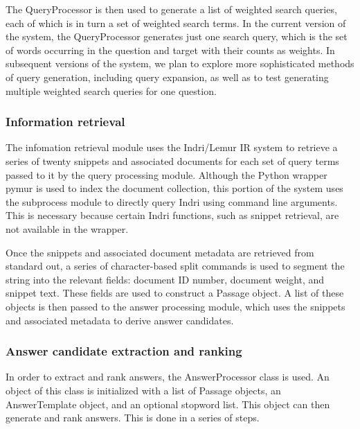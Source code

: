 \documentclass[11pt]{article}
\begin{document}
The QueryProcessor is then used to generate a list of weighted search queries, each of which is in turn a set of weighted search terms. In the current version of the system, the QueryProcessor generates just one search query, which is the set of words occurring in the question and target with their counts as weights. In subsequent versions of the system, we plan to explore more sophisticated methods of query generation, including query expansion, as well as to test generating multiple weighted search queries for one question.

\subsubsection{Information retrieval}

The infomation retrieval module uses the Indri/Lemur IR system to retrieve a series of twenty snippets and associated documents for each set of query terms passed to it by the query processing module. Although the Python wrapper pymur is used to index the document collection, this portion of the system uses the subprocess module to directly query Indri using command line arguments. This is necessary because certain Indri functions, such as snippet retrieval, are not available in the wrapper. 

Once the snippets and associated document metadata are retrieved from standard out, a series of character-based split commands is used to segment the string into the relevant fields: document ID number, document weight, and snippet text. These fields are used to construct a Passage object. A list of these objects is then passed to the answer processing module, which uses the snippets and associated metadata to derive answer candidates.   

\subsubsection{Answer candidate extraction and ranking}

In order to extract and rank answers, the AnswerProcessor class is used.  An object of this class is initialized with a list of Passage objects, an AnswerTemplate object, and an optional stopword list.  This object can then generate and rank answers.  This is done in a series of steps.
\end{document}
